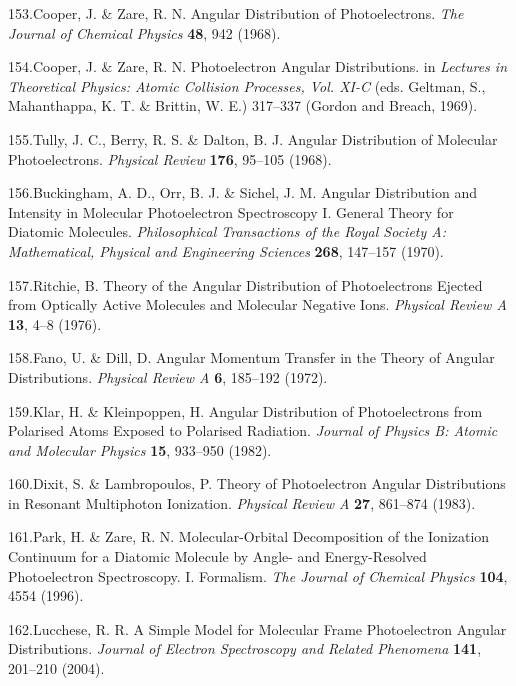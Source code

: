 \documentclass[10pt]{article}
\begin{document}
\label{csl:153}153.Cooper, J. \& Zare, R. N. {Angular {{Distribution}} of {{Photoelectrons}}}. \textit{The Journal of Chemical Physics} \textbf{48}, 942 (1968).

\label{csl:154}154.Cooper, J. \& Zare, R. N. {Photoelectron {{Angular Distributions}}}. in \textit{Lectures in {{Theoretical Physics}}: {{Atomic Collision Processes}}, {{Vol}}. {{XI}}-{{C}}} (eds. Geltman, S., Mahanthappa, K. T. \& Brittin, W. E.) 317–337 ({Gordon and Breach}, 1969).

\label{csl:155}155.Tully, J. C., Berry, R. S. \& Dalton, B. J. {Angular {{Distribution}} of {{Molecular Photoelectrons}}}. \textit{Physical Review} \textbf{176}, 95–105 (1968).

\label{csl:156}156.Buckingham, A. D., Orr, B. J. \& Sichel, J. M. {Angular {{Distribution}} and {{Intensity}} in {{Molecular Photoelectron Spectroscopy I}}. {{General Theory}} for {{Diatomic Molecules}}}. \textit{Philosophical Transactions of the Royal Society A: Mathematical, Physical and Engineering Sciences} \textbf{268}, 147–157 (1970).

\label{csl:157}157.Ritchie, B. {Theory of the Angular Distribution of Photoelectrons Ejected from Optically Active Molecules and Molecular Negative Ions}. \textit{Physical Review A} \textbf{13}, 4–8 (1976).

\label{csl:158}158.Fano, U. \& Dill, D. {Angular {{Momentum Transfer}} in the {{Theory}} of {{Angular Distributions}}}. \textit{Physical Review A} \textbf{6}, 185–192 (1972).

\label{csl:159}159.Klar, H. \& Kleinpoppen, H. {Angular Distribution of Photoelectrons from Polarised Atoms Exposed to Polarised Radiation}. \textit{Journal of Physics B: Atomic and Molecular Physics} \textbf{15}, 933–950 (1982).

\label{csl:160}160.Dixit, S. \& Lambropoulos, P. {Theory of Photoelectron Angular Distributions in Resonant Multiphoton Ionization}. \textit{Physical Review A} \textbf{27}, 861–874 (1983).

\label{csl:161}161.Park, H. \& Zare, R. N. {Molecular-Orbital Decomposition of the Ionization Continuum for a Diatomic Molecule by Angle- and Energy-Resolved Photoelectron Spectroscopy. {{I}}. {{Formalism}}}. \textit{The Journal of Chemical Physics} \textbf{104}, 4554 (1996).

\label{csl:162}162.Lucchese, R. R. {A Simple Model for Molecular Frame Photoelectron Angular Distributions}. \textit{Journal of Electron Spectroscopy and Related Phenomena} \textbf{141}, 201–210 (2004).
\end{document}
